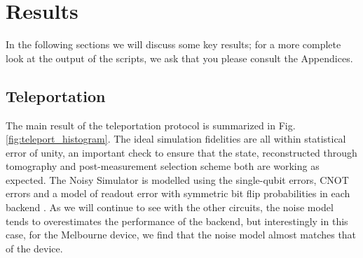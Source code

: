 \section{Results}

In the following sections we will discuss some key results;
for a more complete look at the output of the scripts, we ask that you please
consult the Appendices.

\subsection{Teleportation}

The main result of the teleportation protocol is summarized in Fig.
\ref{fig:teleport_histogram}. The ideal simulation fidelities are all within
statistical error of unity, an important check to ensure that the state,
reconstructed through tomography and post-measurement selection scheme both are
working as expected. The Noisy Simulator is modelled using the single-qubit
errors, CNOT errors and a model of readout error with symmetric bit flip
probabilities in each backend \cite{qiskit_org}. As we will continue to see with
the other circuits, the noise model tends to overestimates the performance of
the backend, but interestingly in this case, for the Melbourne device, we find
that the noise model almost matches that of the device.


